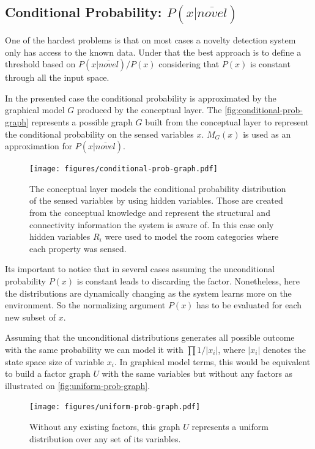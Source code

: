 \documentclass[runningheads,a4paper]{llncs}
\begin{document}
\subsection{Conditional Probability: $P(x|\overline{novel})$}
\label{sec:uniform-unconditional}

One of the hardest problems is that on most cases a novelty detection system only has access to 
the known data.
Under that the best approach is to define a threshold based on $P(x|\overline{novel})/P(x)$
considering that $P(x)$ is constant through all the input space.

In the presented case the conditional probability is approximated by the graphical model $G$
produced by the conceptual layer.
The \autoref{fig:conditional-prob-graph} represents a possible graph $G$ built from the conceptual
layer to represent the conditional probability on the sensed variables $x$.
$M_G(x)$ is used as an approximation for $P(x|\overline{novel})$.

\begin{figure}[h]
\centering
\texttt{[image: figures/conditional-prob-graph.pdf]}
\caption{\label{fig:conditional-prob-graph}The conceptual layer models the conditional
         probability distribution of the sensed variables by using hidden variables.
         Those are created from the conceptual knowledge and represent the structural
         and connectivity information the system is aware of.
         In this case only hidden variables $R_i$ were used to model the room categories
         where each property was sensed.}
\end{figure}


Its important to notice that in several cases assuming the unconditional probability $P(x)$
is constant leads to discarding the factor.
Nonetheless, here the distributions are dynamically changing as the system learns more on the environment.
So the normalizing argument $P(x)$ has to be evaluated for each new subset of $x$.

Assuming that the unconditional distributions generates all possible outcome with the same probability
we can model it with $\prod{1/|x_i|}$, where $|x_i|$ denotes the state space size of variable $x_i$.
In graphical model terms, this would be equivalent to build a factor graph $U$ with the same variables but
without any factors as illustrated on \autoref{fig:uniform-prob-graph}.

\begin{figure}
\centering
\texttt{[image: figures/uniform-prob-graph.pdf]}
\caption{\label{fig:uniform-prob-graph}Without any existing factors, this graph $U$ represents a
         uniform distribution over any set of its variables.}
\end{figure}
\end{document}

